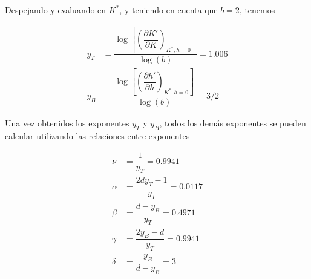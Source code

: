 \documentclass[10pt]{article}
\begin{document}
Despejando y evaluando en $K^*$, y teniendo en cuenta que $b=2$, tenemos

\begin{align}
y_T &= \dfrac{\log\left[ \left( \dfrac{\partial K'}{\partial K}  \right)_{K^{*},h=0} \right]}{\log(b)} = 1.006 \\
y_B &= \dfrac{\log\left[ \left( \dfrac{\partial h'}{\partial h}  \right)_{K^{*},h=0} \right]}{\log(b)} = 3/2
\end{align}

Una vez obtenidos los exponentes $y_T$ y $y_B$, todos los dem\'as exponentes se pueden calcular utilizando las relaciones entre exponentes

\begin{align}
\nu &= \dfrac{1}{y_T} =0.9941\\
\alpha &= \dfrac{2d y_T - 1}{y_T} = 0.0117 \\
\beta &= \dfrac{d-y_B}{y_T} = 0.4971 \\
\gamma &= \dfrac{2 y_B - d}{y_T} = 0.9941 \\
\delta &= \dfrac{y_B}{d-y_B} = 3 
\end{align}
\end{document}

